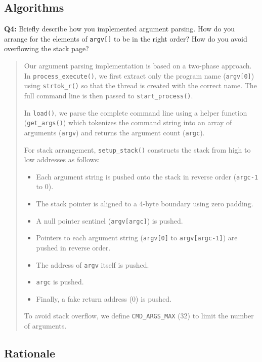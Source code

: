 \documentclass[a4paper,11pt]{paper}
\begin{document}
\subsection{Algorithms}


\textbf{Q4:} Briefly describe how you implemented argument parsing.  How do you arrange for the elements of \texttt{argv[]} to be in the right order? How do you avoid overflowing the stack page?

\begin{quote}
Our argument parsing implementation is based on a two-phase approach. In \texttt{process\_execute()}, we first extract only the program name (\texttt{argv[0]}) using \texttt{strtok\_r()} so that the thread is created with the correct name. The full command line is then passed to \texttt{start\_process()}.

In \texttt{load()}, we parse the complete command line using a helper function (\texttt{get\_args()}) which tokenizes the command string into an array of arguments (\texttt{argv}) and returns the argument count (\texttt{argc}).

For stack arrangement, \texttt{setup\_stack()} constructs the stack from high to low addresses as follows:
\begin{itemize}
    \item Each argument string is pushed onto the stack in reverse order (\texttt{argc-1} to 0).
    \item The stack pointer is aligned to a 4-byte boundary using zero padding.
    \item A null pointer sentinel (\texttt{argv[argc]}) is pushed.
    \item Pointers to each argument string (\texttt{argv[0]} to \texttt{argv[argc-1]}) are pushed in reverse order.
    \item The address of \texttt{argv} itself is pushed.
    \item \texttt{argc} is pushed.
    \item Finally, a fake return address (0) is pushed.
\end{itemize}

To avoid stack overflow, we define \texttt{CMD\_ARGS\_MAX} (32) to limit the number of arguments.

\end{quote}

\newpage
\subsection{Rationale}
\end{document}
